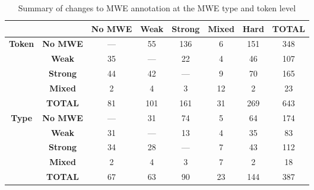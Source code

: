 \documentclass[output=paper
,modfonts
,nonflat]{langsci/langscibook}
\newcommand{\zp}{\phantom{0}}
\begin{document}
\begin{table*}[t!]
\caption{Summary of changes to MWE annotation at the MWE type and token level} %
\begin{tabular}{c c c c c c c c} %
\toprule %
&&\textbf{No MWE}&\textbf{Weak}&\textbf{Strong}&\textbf{Mixed}&\textbf{Hard}&\textbf{TOTAL}\\
\midrule

\multirow{4}{*}{\textbf{Token}}&\textbf{No MWE}  &--- &\zp 55 & 136 &\zp6& 151  &348\\
&\textbf{Weak}                                   &35  &\zp--- & \zp22&\zp4& \zp46 &107\\
&\textbf{Strong}                                 &44  &\zp42  &---  &\zp9&\zp70  &165\\
&\textbf{Mixed}                                  &\zp2 &\zp\zp4 &\zp\zp3&12 &\zp\zp2 &\zp23\\
\cmidrule{2-8}
&\textbf{TOTAL}                                  &81  &101   &161  &31 &269   &643\\
\midrule
\multirow{4}{*}{\textbf{Type}}&\textbf{No MWE}   &--- &\zp31  &\zp74 &\zp5&\zp64  &174\\
&\textbf{Weak}                                   &31  &---   &\zp13 &\zp4&\zp35  &\zp83\\
&\textbf{Strong}                                 &34  &\zp28  &---  &\zp7&\zp43  &112\\
&\textbf{Mixed}                                  &\zp2 &\zp\zp4 &\zp\zp3&\zp7&\zp\zp2 &\zp18\\
\cmidrule{2-8}
&\textbf{TOTAL}                                  &67  &\zp63  &\zp90 &23 &144   &387\\
\bottomrule
\end{tabular}%
\label{tab:changes} %
\end{table*}
\end{document}
